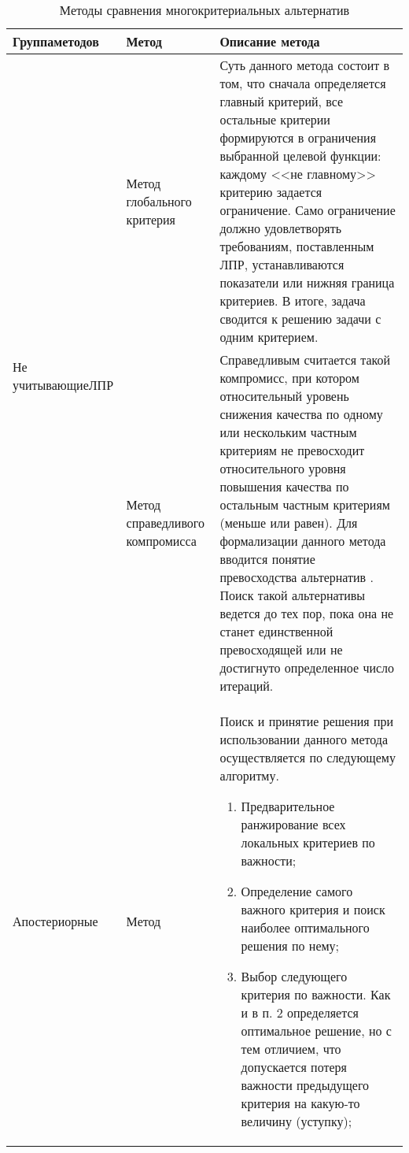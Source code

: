 \begin{table}[H]
	\centering
	\caption{Методы сравнения многокритериальных альтернатив}
	\label{mko_table_0}
	\begin{tabular}{|p{3.3cm}|p{2.4cm}|p{9.5cm}|}
		\hline
		\textbf{Группа\linebreak методов} & \textbf{Метод} & \textbf{Описание метода} \\
		\hline
		\multirow{2}{3.3cm}{Не учитывающие ЛПР} & Метод глобального критерия & Суть данного метода состоит в том, что сначала определяется главный критерий, все остальные критерии формируются в ограничения выбранной целевой функции: каждому <<не главному>> критерию задается
		ограничение. Само ограничение должно удовлетворять требованиям, поставленным
		ЛПР, устанавливаются показатели или нижняя граница критериев. В итоге, задача сводится к решению задачи с одним критерием.\\
		\cline{2-3} & Метод справедливого компромисса & Справедливым \cite{compromise} считается такой компромисс, при котором относительный уровень снижения качества по одному или нескольким частным критериям не превосходит относительного уровня повышения качества по остальным частным критериям (меньше или равен). Для формализации данного метода вводится понятие превосходства альтернатив \cite{compromise}. Поиск такой альтернативы ведется до тех пор, пока она не станет единственной превосходящей или не достигнуто определенное число итераций.\\
		\hline
		Апостериорные & Метод & Поиск и принятие решения при использовании данного метода осуществляется по следующему алгоритму.
		\begin{enumerate}
			\item Предварительное ранжирование всех локальных критериев по важности; 
			\item Определение самого важного критерия и поиск наиболее оптимального решения по нему;
			\item Выбор следующего критерия по важности. Как и в п. 2 определяется
			оптимальное решение, но с тем отличием, что допускается потеря важности
			предыдущего критерия на какую-то величину (уступку);
		\end{enumerate}\\
		\hline
	\end{tabular}
\end{table}

